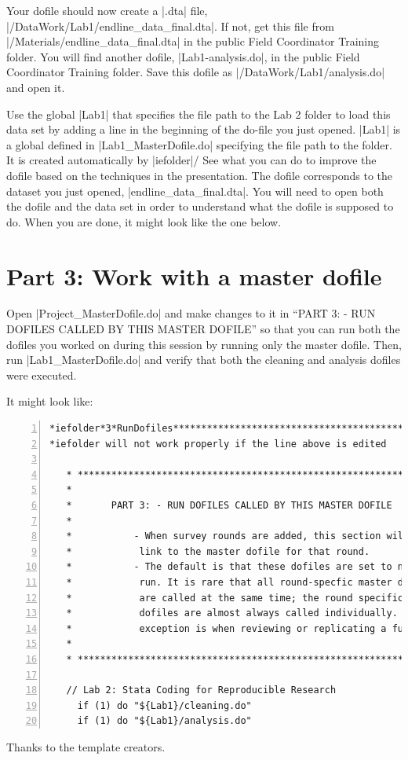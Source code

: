 \documentclass{tufte-handout}
\begin{document}
Your dofile should now create a |.dta| file,
|/DataWork/Lab1/endline_data_final.dta|.
If not, get this file from |/Materials/endline_data_final.dta|
in the public Field Coordinator Training folder.
You will find another dofile, |Lab1-analysis.do|,
in the public Field Coordinator Training folder.
Save this dofile as |/DataWork/Lab1/analysis.do| and open it.

Use the global |Lab1| that specifies the file path
to the Lab 2 folder to load this data set
by adding a line in the beginning of the do-file you just opened.
|Lab1| is a global defined in |Lab1_MasterDofile.do|
specifying the file path to the folder.
It is created automatically by |iefolder|/
See what you can do to improve the dofile
based on the techniques in the presentation.
The dofile corresponds to the dataset you just opened,
|endline_data_final.dta|.
You will need to open both the dofile and the data set
in order to understand what the dofile is supposed to do.
When you are done, it might look like the one below.

\begin{figure}[h]
{
}
\end{figure}

\section{Part 3: Work with a master dofile}

Open |Project_MasterDofile.do| and make changes to it
in ``PART 3: - RUN DOFILES CALLED BY THIS MASTER DOFILE''
so that you can run both the dofiles you worked on during this session
by running only the master dofile.
Then, run |Lab1_MasterDofile.do| and verify
that both the cleaning and analysis dofiles were executed.

It might look like:

\begin{Verbatim}[frame=leftline,numbers=left]
*iefolder*3*RunDofiles**********************************************************
*iefolder will not work properly if the line above is edited

   * ******************************************************************** *
   *
   *       PART 3: - RUN DOFILES CALLED BY THIS MASTER DOFILE
   *
   *           - When survey rounds are added, this section will
   *            link to the master dofile for that round.
   *           - The default is that these dofiles are set to not
   *            run. It is rare that all round-specfic master dofiles
   *            are called at the same time; the round specific master
   *            dofiles are almost always called individually. The
   *            exception is when reviewing or replicating a full project.
   *
   * ******************************************************************** *

   // Lab 2: Stata Coding for Reproducible Research
     if (1) do "${Lab1}/cleaning.do"
     if (1) do "${Lab1}/analysis.do"
\end{Verbatim}

Thanks to the template creators.\cite{tuftelatex}



\end{document}
